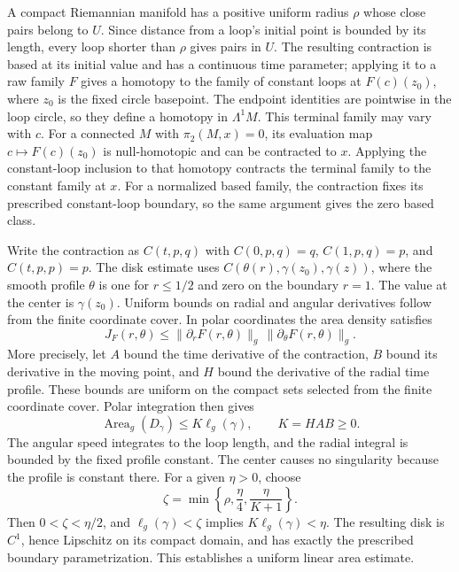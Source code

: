 A compact Riemannian manifold has a positive uniform radius $\rho$
whose close pairs belong to $U$. Since distance from a loop's initial
point is bounded by its length, every loop shorter than $\rho$ gives
pairs in $U$. The resulting contraction is based at its initial value
and has a continuous time parameter;
applying it to a raw family $F$ gives a homotopy to the family of constant
loops at $F(c)(z_0)$, where $z_0$ is the fixed circle basepoint. The
endpoint identities are pointwise in the loop circle, so they define a
homotopy in $\Lambda^1M$. This terminal family may vary with $c$.
For a connected $M$ with $\pi_2(M,x)=0$, its evaluation map
$c\mapsto F(c)(z_0)$ is null-homotopic and can be contracted to $x$.
Applying the constant-loop inclusion to that homotopy contracts the
terminal family to the constant family at $x$. For a normalized based
family, the contraction fixes its prescribed constant-loop boundary,
so the same argument gives the zero based class.

Write the contraction as $C(t,p,q)$ with $C(0,p,q)=q$,
$C(1,p,q)=p$, and $C(t,p,p)=p$. The disk estimate uses
$C(\theta(r),\gamma(z_0),\gamma(z))$, where the smooth profile $\theta$
is one for $r\leq1/2$ and zero on the boundary $r=1$.
The value at the center is $\gamma(z_0)$. Uniform bounds on radial
and angular derivatives follow from the finite coordinate cover. In polar
coordinates the area density satisfies
\[
 J_F(r,\theta)\leq
 \|\partial_rF(r,\theta)\|_g\,
 \|\partial_\theta F(r,\theta)\|_g.
\]
More precisely, let $A$ bound the time derivative of the contraction,
$B$ bound its derivative in the moving point, and $H$ bound the derivative
of the radial time profile. These bounds are uniform on the compact
sets selected from the finite coordinate cover. Polar integration then
gives
\[
 \operatorname{Area}_g(D_\gamma)\leq K\ell_g(\gamma),\qquad K=HAB\geq0.
\]
The angular speed integrates to the loop length, and the radial integral
is bounded by the fixed profile constant. The center causes no
singularity because the profile is constant there. For a given
$\eta>0$, choose
\[
 \zeta=\min\left\{\rho,\frac{\eta}{4},\frac{\eta}{K+1}\right\}.
\]
Then $0<\zeta<\eta/2$, and $\ell_g(\gamma)<\zeta$ implies
$K\ell_g(\gamma)<\eta$. The resulting disk is $C^1$, hence Lipschitz
on its compact domain, and has exactly the prescribed boundary
parametrization. This establishes a uniform linear area estimate.

